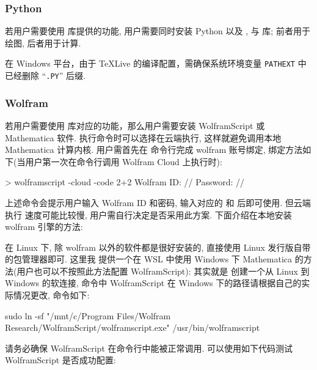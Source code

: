 \documentclass[
  hyper, 
  lang = cn, 
  class = l3doc,
  classOption={11pt},
  sect = {load=false},
]{../../zlatex/code/ztex}
\begin{document}
\vspace*{-.5em}
\subsubsection{Python}
若用户需要使用  库提供的功能, 用户需要同时安装 Python 以及 , 
 与  库; 前者用于绘图, 后者用于计算.

在 Windows 平台，由于 \TeX{}Live 的编译配置，需确保系统环境变量 \texttt{PATHEXT} 中已经删除 ``\texttt{.PY}'' 后缀. 

\vspace*{-.5em}
\subsubsection{Wolfram}
若用户需要使用  库对应的功能，那么用户需要安装 WolframScript 或
Mathematica 软件. 执行命令时可以选择在云端执行, 这样就避免调用本地 Mathematica 计算内核. 用户需首先在
命令行完成 wolfram 账号绑定, 绑定方法如下(当用户第一次在命令行调用 Wolfram Cloud 上执行时):

\begin{DocExample}
> wolframscript -cloud -code 2+2
Wolfram ID: //
Password: //
\end{DocExample}

上述命令会提示用户输入 Wolfram ID 和密码, 输入对应的  和  后即可使用. 但云端执行
速度可能比较慢, 用户需自行决定是否采用此方案. 下面介绍在本地安装 wolfram 引擎的方法:


在 Linux 下, 除 wolfram 以外的软件都是很好安装的, 直接使用 Linux 发行版自带的包管理器即可. 这里我
提供一个在 WSL 中使用 Windows 下 Mathematica 的方法(用户也可以不按照此方法配置 WolframScript): 其实就是
创建一个从 Linux 到 Windows 的软连接, 命令中 WolframScript 在 Windows 下的路径请根据自己的实际情况更改, 命令如下:

\begin{DocExample}[++]
sudo ln -sf "/mnt/c/Program Files/Wolfram Research/WolframScript/wolframscript.exe" /usr/bin/wolframscript
\end{DocExample}


请务必确保 WolframScript 在命令行中能被正常调用. 可以使用如下代码测试 WolframScript 是否成功配置: 
\end{document}
